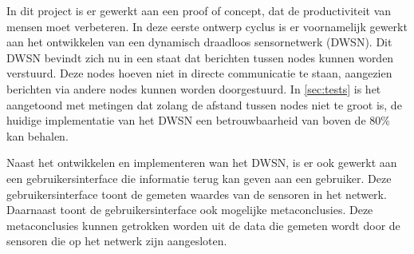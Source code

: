 




In dit project is er gewerkt aan een proof of concept, dat de productiviteit van mensen moet verbeteren. In deze eerste ontwerp cyclus is er voornamelijk gewerkt aan het ontwikkelen van een dynamisch draadloos sensornetwerk (DWSN). Dit DWSN bevindt zich nu in een staat dat berichten tussen nodes kunnen worden verstuurd. Deze nodes hoeven niet in directe communicatie te staan, aangezien berichten via andere nodes kunnen worden doorgestuurd. In \autoref{sec:tests} is het aangetoond met metingen dat zolang de afstand tussen nodes niet te groot is, de huidige implementatie van het DWSN een betrouwbaarheid van boven de 80\% kan behalen. 

Naast het ontwikkelen en implementeren wan het DWSN, is er ook gewerkt aan een gebruikersinterface die informatie terug kan geven aan een gebruiker. Deze gebruikersinterface toont de gemeten waardes van de sensoren in het netwerk. Daarnaast toont de gebruikersinterface ook mogelijke metaconclusies. Deze metaconclusies kunnen getrokken worden uit de data die gemeten wordt door de sensoren die op het netwerk zijn aangesloten.

